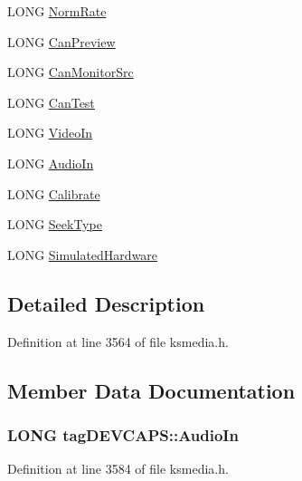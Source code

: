 \begin{DoxyCompactItemize}
\item 
L\+O\+NG \hyperlink{structtag_d_e_v_c_a_p_s_a2fa5bad968faff0b5ce48ec745ea1d63}{Norm\+Rate}
\item 
L\+O\+NG \hyperlink{structtag_d_e_v_c_a_p_s_a503404a3a421644fe506eccce475eaa9}{Can\+Preview}
\item 
L\+O\+NG \hyperlink{structtag_d_e_v_c_a_p_s_a9d902bef91a8b6fd554ea42f522f00b4}{Can\+Monitor\+Src}
\item 
L\+O\+NG \hyperlink{structtag_d_e_v_c_a_p_s_aab9a87be6528e39e4c0e4cbafc9adaba}{Can\+Test}
\item 
L\+O\+NG \hyperlink{structtag_d_e_v_c_a_p_s_ae3d204a2b0991cab4b3dc6aa579f6020}{Video\+In}
\item 
L\+O\+NG \hyperlink{structtag_d_e_v_c_a_p_s_a505560bd2bd2f7bd929c2014b332f23f}{Audio\+In}
\item 
L\+O\+NG \hyperlink{structtag_d_e_v_c_a_p_s_aace759d9cfdbc031e6220916ec82c640}{Calibrate}
\item 
L\+O\+NG \hyperlink{structtag_d_e_v_c_a_p_s_a220899622129ffb612f9a769996bad77}{Seek\+Type}
\item 
L\+O\+NG \hyperlink{structtag_d_e_v_c_a_p_s_abe1bb39167453597db394369b95e6ec6}{Simulated\+Hardware}
\end{DoxyCompactItemize}


\subsection{Detailed Description}


Definition at line 3564 of file ksmedia.\+h.



\subsection{Member Data Documentation}
\subsubsection[{\texorpdfstring{Audio\+In}{AudioIn}}]{\setlength{\rightskip}{0pt plus 5cm}L\+O\+NG tag\+D\+E\+V\+C\+A\+P\+S\+::\+Audio\+In}\hypertarget{structtag_d_e_v_c_a_p_s_a505560bd2bd2f7bd929c2014b332f23f}{}\label{structtag_d_e_v_c_a_p_s_a505560bd2bd2f7bd929c2014b332f23f}


Definition at line 3584 of file ksmedia.\+h.

